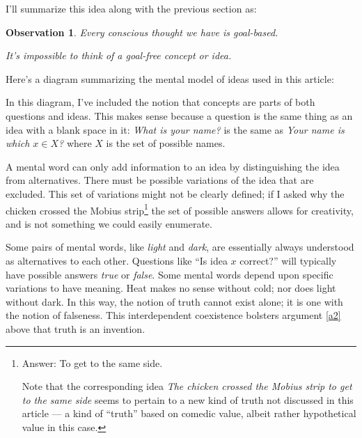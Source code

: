 \documentclass[11pt, oneside]{article}   	%
\newtheorem{obs}{Observation}
\begin{document}

I'll summarize this idea along with the previous section as:
\begin{obs}\label{o4}
    Every conscious thought we have is goal-based.

    \medskip

    It's impossible to think of a goal-free concept or idea.
\end{obs}

Here's a diagram summarizing the mental model of ideas used in this
article:

\begin{center}
%
\end{center}

In this diagram, I've included the notion that concepts are parts of both
questions and ideas.
This makes sense because a question is the same thing as an idea
with a blank space in it: {\em What is your name?} is the same as
{\em Your name is which $x\in X$?} where $X$ is the set of possible names.

A mental word can only add information to an idea by distinguishing the idea
from alternatives.
There must be possible variations of the idea that are excluded.
This set of variations might not be clearly defined;
if I asked why the chicken crossed the Mobius strip\footnote{Answer: To
get to the same side.\par Note that the corresponding idea {\em The chicken
crossed the Mobius strip to get to the same side} seems to pertain to a new
kind of truth not discussed in this article ---
a kind of ``truth'' based on comedic
value, albeit rather hypothetical value in this case.}
the set of possible answers allows for creativity, and is not something we could
easily enumerate.

Some pairs of mental words, like {\em light} and {\em dark}, are essentially
always understood as alternatives to each other.
Questions like ``Is idea $x$
correct?'' will typically have possible answers {\em true} or {\em false}.
Some mental words depend upon specific variations to have meaning.
Heat makes no sense without cold; nor does light without dark.
In this way, the notion of truth cannot exist alone;
it is one with the notion of falseness. This interdependent
coexistence bolsters argument
\ref{a2} above that truth is an invention.
\end{document}
